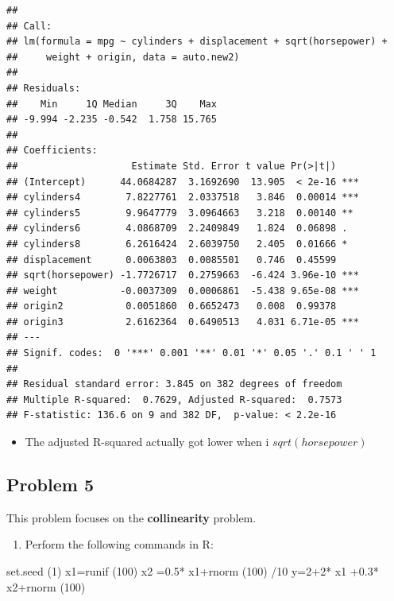 \documentclass[
]{article}
\newenvironment{Shaded}{\begin{snugshade}}{\end{snugshade}}
\newcommand{\DecValTok}[1]{\textcolor[rgb]{0.00,0.00,0.81}{#1}}
\newcommand{\FloatTok}[1]{\textcolor[rgb]{0.00,0.00,0.81}{#1}}
\newcommand{\FunctionTok}[1]{\textcolor[rgb]{0.00,0.00,0.00}{#1}}
\newcommand{\NormalTok}[1]{#1}
\newcommand{\OtherTok}[1]{\textcolor[rgb]{0.56,0.35,0.01}{#1}}
\newcommand{\SpecialCharTok}[1]{\textcolor[rgb]{0.00,0.00,0.00}{#1}}
\providecommand{\tightlist}{%
  \setlength{\itemsep}{0pt}\setlength{\parskip}{0pt}}
\begin{document}
\begin{verbatim}
## 
## Call:
## lm(formula = mpg ~ cylinders + displacement + sqrt(horsepower) + 
##     weight + origin, data = auto.new2)
## 
## Residuals:
##    Min     1Q Median     3Q    Max 
## -9.994 -2.235 -0.542  1.758 15.765 
## 
## Coefficients:
##                    Estimate Std. Error t value Pr(>|t|)    
## (Intercept)      44.0684287  3.1692690  13.905  < 2e-16 ***
## cylinders4        7.8227761  2.0337518   3.846  0.00014 ***
## cylinders5        9.9647779  3.0964663   3.218  0.00140 ** 
## cylinders6        4.0868709  2.2409849   1.824  0.06898 .  
## cylinders8        6.2616424  2.6039750   2.405  0.01666 *  
## displacement      0.0063803  0.0085501   0.746  0.45599    
## sqrt(horsepower) -1.7726717  0.2759663  -6.424 3.96e-10 ***
## weight           -0.0037309  0.0006861  -5.438 9.65e-08 ***
## origin2           0.0051860  0.6652473   0.008  0.99378    
## origin3           2.6162364  0.6490513   4.031 6.71e-05 ***
## ---
## Signif. codes:  0 '***' 0.001 '**' 0.01 '*' 0.05 '.' 0.1 ' ' 1
## 
## Residual standard error: 3.845 on 382 degrees of freedom
## Multiple R-squared:  0.7629, Adjusted R-squared:  0.7573 
## F-statistic: 136.6 on 9 and 382 DF,  p-value: < 2.2e-16
\end{verbatim}

\begin{itemize}
\tightlist
\item
  The adjusted R-squared actually got lower when i \(sqrt(horsepower)\)
  \newpage
\end{itemize}

\hypertarget{problem-5}{%
\subsection{Problem 5}\label{problem-5}}

This problem focuses on the \textbf{collinearity} problem.

\begin{enumerate}
\def\labelenumi{(\alph{enumi})}
\tightlist
\item
  Perform the following commands in R:
\end{enumerate}

\begin{Shaded}
\begin{Highlighting}[]
\FunctionTok{set.seed}\NormalTok{ (}\DecValTok{1}\NormalTok{)}
\NormalTok{x1}\OtherTok{=}\FunctionTok{runif}\NormalTok{ (}\DecValTok{100}\NormalTok{)}
\NormalTok{x2 }\OtherTok{=}\FloatTok{0.5}\SpecialCharTok{*}\NormalTok{ x1}\SpecialCharTok{+}\FunctionTok{rnorm}\NormalTok{ (}\DecValTok{100}\NormalTok{) }\SpecialCharTok{/}\DecValTok{10}
\NormalTok{y}\OtherTok{=}\DecValTok{2}\SpecialCharTok{+}\DecValTok{2}\SpecialCharTok{*}\NormalTok{ x1 }\SpecialCharTok{+}\FloatTok{0.3}\SpecialCharTok{*}\NormalTok{ x2}\SpecialCharTok{+}\FunctionTok{rnorm}\NormalTok{ (}\DecValTok{100}\NormalTok{)}
\end{Highlighting}
\end{Shaded}
\end{document}
